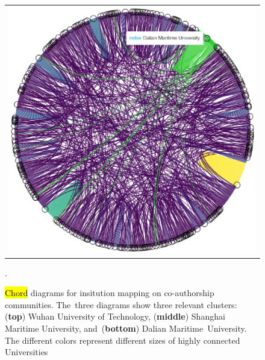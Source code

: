 \documentclass[jmse,review,accept,pdftex,moreauthors]{Definitions/mdpi}
\begin{document}
\begin{figure}[H]
\begin{tabular}{l}
	\includegraphics[height=0.3\textheight, keepaspectratio]{pics/coauthorship_inst_chord_3.eps}\\
	\end{tabular}
	\caption{\hl{Chord} %
 diagrams for insitution mapping on co-authorship communities. The~three diagrams show three relevant clusters: (\textbf{top}) Wuhan University of Technology, (\textbf{middle}) Shanghai Maritime University, and~(\textbf{bottom}) Dalian Maritime~University. The different colors represent different sizes of highly connected Universities}\label{fig:fig6}.
\end{figure}
\unskip
\end{document}
